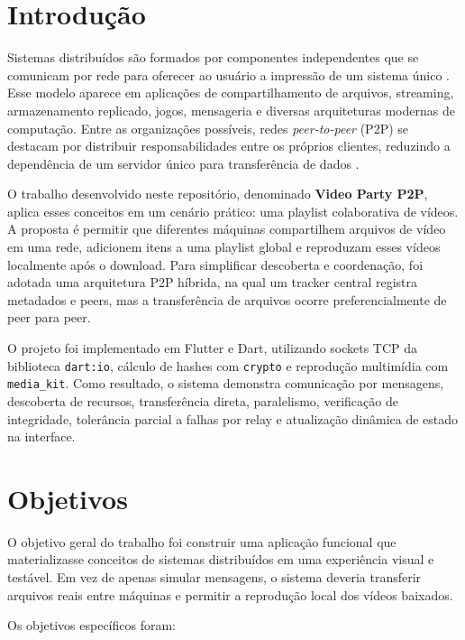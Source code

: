 \documentclass[
	12pt,
	oneside,
	a4paper,
	chapter=TITLE,
	section=TITLE,
	english,
	brazilian,
	sumario=tradicional
]{abntex2}
\begin{document}
\textual

\section{Introdução}

Sistemas distribuídos são formados por componentes independentes que se comunicam por rede para oferecer ao usuário a impressão de um sistema único \cite{tanenbaum2017distributed}. Esse modelo aparece em aplicações de compartilhamento de arquivos, streaming, armazenamento replicado, jogos, mensageria e diversas arquiteturas modernas de computação. Entre as organizações possíveis, redes \textit{peer-to-peer} (P2P) se destacam por distribuir responsabilidades entre os próprios clientes, reduzindo a dependência de um servidor único para transferência de dados \cite{coulouris2012distributed}.

O trabalho desenvolvido neste repositório, denominado \textbf{Video Party P2P}, aplica esses conceitos em um cenário prático: uma playlist colaborativa de vídeos. A proposta é permitir que diferentes máquinas compartilhem arquivos de vídeo em uma rede, adicionem itens a uma playlist global e reproduzam esses vídeos localmente após o download. Para simplificar descoberta e coordenação, foi adotada uma arquitetura P2P híbrida, na qual um tracker central registra metadados e peers, mas a transferência de arquivos ocorre preferencialmente de peer para peer.

O projeto foi implementado em Flutter e Dart, utilizando sockets TCP da biblioteca \texttt{dart:io}, cálculo de hashes com \texttt{crypto} e reprodução multimídia com \texttt{media\_kit}. Como resultado, o sistema demonstra comunicação por mensagens, descoberta de recursos, transferência direta, paralelismo, verificação de integridade, tolerância parcial a falhas por relay e atualização dinâmica de estado na interface.

\section{Objetivos}

O objetivo geral do trabalho foi construir uma aplicação funcional que materializasse conceitos de sistemas distribuídos em uma experiência visual e testável. Em vez de apenas simular mensagens, o sistema deveria transferir arquivos reais entre máquinas e permitir a reprodução local dos vídeos baixados.

Os objetivos específicos foram:
\end{document}
